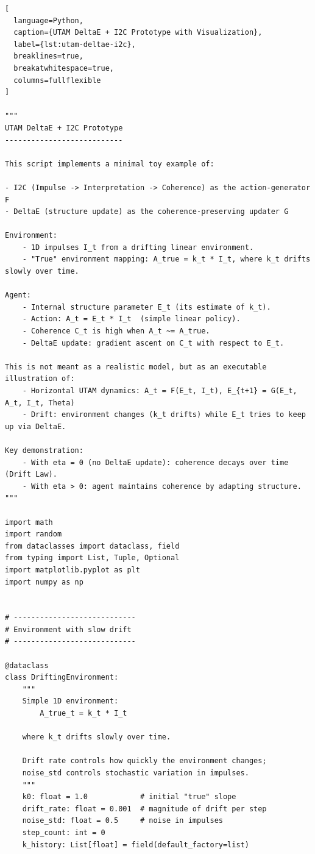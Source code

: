 \documentclass[12pt,a4paper]{report}
\begin{document}
\begin{lstlisting}[
  language=Python,
  caption={UTAM DeltaE + I2C Prototype with Visualization},
  label={lst:utam-deltae-i2c},
  breaklines=true,
  breakatwhitespace=true,
  columns=fullflexible
]

"""
UTAM DeltaE + I2C Prototype
---------------------------

This script implements a minimal toy example of:

- I2C (Impulse -> Interpretation -> Coherence) as the action-generator F
- DeltaE (structure update) as the coherence-preserving updater G

Environment:
    - 1D impulses I_t from a drifting linear environment.
    - "True" environment mapping: A_true = k_t * I_t, where k_t drifts slowly over time.

Agent:
    - Internal structure parameter E_t (its estimate of k_t).
    - Action: A_t = E_t * I_t  (simple linear policy).
    - Coherence C_t is high when A_t ~= A_true.
    - DeltaE update: gradient ascent on C_t with respect to E_t.

This is not meant as a realistic model, but as an executable illustration of:
    - Horizontal UTAM dynamics: A_t = F(E_t, I_t), E_{t+1} = G(E_t, A_t, I_t, Theta)
    - Drift: environment changes (k_t drifts) while E_t tries to keep up via DeltaE.

Key demonstration:
    - With eta = 0 (no DeltaE update): coherence decays over time (Drift Law).
    - With eta > 0: agent maintains coherence by adapting structure.
"""

import math
import random
from dataclasses import dataclass, field
from typing import List, Tuple, Optional
import matplotlib.pyplot as plt
import numpy as np


# ----------------------------
# Environment with slow drift
# ----------------------------

@dataclass
class DriftingEnvironment:
    """
    Simple 1D environment:
        A_true_t = k_t * I_t

    where k_t drifts slowly over time.

    Drift rate controls how quickly the environment changes;
    noise_std controls stochastic variation in impulses.
    """
    k0: float = 1.0            # initial "true" slope
    drift_rate: float = 0.001  # magnitude of drift per step
    noise_std: float = 0.5     # noise in impulses
    step_count: int = 0
    k_history: List[float] = field(default_factory=list)


\end{lstlisting}
\end{document}
